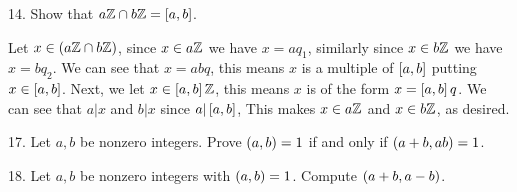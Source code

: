 \begin{mdframed}[style=darkAnswer,frametitle={Joe Starr}]
    
\end{mdframed}
\newpage
\begin{mdframed}[style=darkQuesion]
14. Show that $a\mathbb{Z} \cap b\mathbb{Z}=\left[a,b\right]$.
\end{mdframed}

\begin{mdframed}[style=darkAnswer,frametitle={Joe Starr}]
    Let $x\in \left(a\mathbb{Z} \cap b\mathbb{Z}\right)$, since $x\in a\mathbb{Z}$ we have $x=aq_1$, similarly 
    since $x\in b\mathbb{Z}$ we have$x=bq_2$. We can see that $x=abq$, this means $x$ 
    is a multiple of $\left[a,b\right]$ putting $x\in \left[a,b\right]$. Next, we let 
    $x\in \left[a,b\right]\mathbb{Z}$, this means $x$ is of the form $x=\left[a,b\right]q$. We can see
    that $a\vert x$ and $b\vert x$ since $a\vert \left[a,b\right]$, This makes 
    $x\in a\mathbb{Z}$ and $x\in b\mathbb{Z}$, as desired. 
\end{mdframed}
\newpage
\begin{mdframed}[style=darkQuesion]
17. Let $a,b$ be nonzero integers. Prove $\left(a,b\right)=1$ if and only if 
$\left(a+b,ab\right)=1$. 
\end{mdframed}

\begin{mdframed}[style=darkAnswer,frametitle={Joe Starr}]
    
\end{mdframed}
\newpage
\begin{mdframed}[style=darkQuesion]
18. Let $a,b$ be nonzero integers with $\left(a,b\right)=1$. Compute $\left(a+b,a-b\right)$. 
\end{mdframed}


